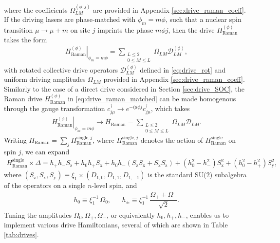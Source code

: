 \documentclass[nofootinbib,notitlepage,11pt]{revtex4-2}
\renewcommand{\t}{\text} %
\newcommand{\f}[2]{\dfrac{#1}{#2}} %
\newcommand{\p}[1]{\left(#1\right)} %
\newcommand{\1}{\mathds{1}}
\newcommand{\x}{\text{x}}
\newcommand{\y}{\text{y}}
\newcommand{\z}{\text{z}}
\newcommand{\D}{\mathcal{D}}
\begin{document}
where the coefficients $\Omega_{LM}^{(\phi,j)}$ are provided in
Appendix \ref{sec:drive_raman_coeff}.  If the driving lasers are
phase-matched with $\phi_m=m\phi$, such that a nuclear spin transition
$\mu\to\mu+m$ on site $j$ imprints the phase $m\phi j$, then the drive
$H_{\t{Raman}}^{(\phi)}$ takes the form
\begin{align}
  \left. H_{\t{Raman}}^{(\phi)} \right|_{\phi_m=m\phi}
  = \sum_{\substack{L\le2\\0\le M\le L}}
  \Omega_{LM} \D_{LM}^{(\phi)},
  \label{eq:drive_raman_matched}
\end{align}
with rotated collective drive operators $\D_{LM}^{(\phi)}$ defined in
\eqref{eq:drive_rot} and uniform driving amplitudes $\Omega_{LM}$
provided in Appendix \ref{sec:drive_raman_coeff}.  Similarly to the
case of a direct drive considered in Section \ref{sec:drive_SOC}, the
Raman drive $H_{\t{Raman}}^{(\phi)}$ in \eqref{eq:drive_raman_matched}
can be made homogenous through the gauge transformation
$c_{j\mu}^\dag \to e^{-i\mu\phi j} c_{j\mu}^\dag$, which takes
\begin{align}
  \left. H_{\t{Raman}}^{(\phi)} \right|_{\phi_m=m\phi}
  \to H_{\t{Raman}}
  = \sum_{\substack{L\le2\\0\le M\le L}} \Omega_{LM} \D_{LM}.
\end{align}
Writing $H_{\t{Raman}} = \sum_j H_{\t{Raman}}^{\t{single},j}$, where
$H_{\t{Raman}}^{\t{single},j}$ denotes the action of
$H_{\t{Raman}}^{\t{single}}$ on spin $j$, we can expand
\begin{align}
  H_{\t{Raman}}^{\t{single}} \times \Delta
  = h_+ h_- S_\z + h_0 h_+ S_\x
  + h_0 h_- \p{S_\z S_\x  + S_\x S_\z}
  + \p{h_0^2 - h_-^2} S_\x^2 + \p{h_0^2 - h_+^2} S_\y^2,
\end{align}
where
$\p{S_\z,S_\x,S_\y} \equiv \xi_1\times\p{D_{1,0},D_{1,1},D_{1,-1}}$ is
the standard SU(2) subalgebra of the operators on a single $n$-level
spin, and
\begin{align}
  h_0 \equiv \xi_1^{-1}\, \Omega_0,
  &&
  h_\pm \equiv \xi_1^{-1}\, \f{\Omega_+\pm\Omega_-}{\sqrt{2}}.
\end{align}
Tuning the amplitudes $\Omega_0,\Omega_+,\Omega_-$, or equivalently
$h_0,h_+,h_-$, enables us to implement various drive Hamiltonians,
several of which are shown in Table \ref{tab:drives}.
\end{document}
